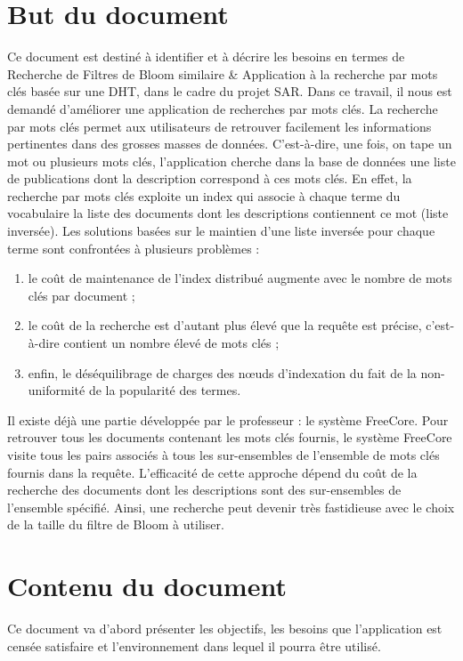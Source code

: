 \documentclass[a4paper,12pt]{report}
\begin{document}
	\section{But du document}
		Ce document est destiné à identifier et à décrire les besoins en termes de Recherche de Filtres de Bloom similaire \& Application à la recherche par mots clés basée sur une DHT, dans le cadre du projet SAR.
Dans ce travail, il nous est demandé d’améliorer une application de recherches par mots clés. La recherche par mots clés permet aux utilisateurs de retrouver facilement les informations pertinentes dans des grosses masses de données. C’est-à-dire, une fois, on tape un mot ou plusieurs mots clés, l’application cherche dans la base de données une liste de publications dont la description correspond à ces mots clés. 
En effet, la recherche par mots clés exploite un index qui associe à chaque terme du vocabulaire la liste des documents dont les descriptions contiennent ce mot (liste inversée). 
Les solutions basées sur le maintien d'une liste inversée pour chaque terme sont confrontées à plusieurs problèmes : 
		\begin{enumerate}
			\item le coût de  maintenance de l’index distribué augmente avec le nombre de mots clés par document ; 
			\item     le coût de la recherche est d’autant plus élevé que la requête est précise, c’est-à-dire contient un nombre élevé de mots clés ;
			\item enfin, le déséquilibrage de charges des nœuds d’indexation du fait de la non-uniformité de la popularité des termes. 
		\end{enumerate}

	Il existe déjà une partie développée par le professeur : le système FreeCore. Pour retrouver tous les documents contenant les mots clés fournis, le système FreeCore visite tous les pairs associés à tous les sur-ensembles de l’ensemble de mots clés fournis dans la requête. L'efficacité de cette approche dépend du coût de la recherche des documents dont les descriptions sont des sur-ensembles de l'ensemble spécifié. Ainsi, une recherche peut devenir très fastidieuse avec le choix de la taille du filtre de Bloom à utiliser. 
	\section{Contenu du document}
		Ce document va d’abord présenter les objectifs, les besoins que l’application est censée satisfaire et l’environnement dans lequel il pourra être utilisé. 
		
\end{document}
